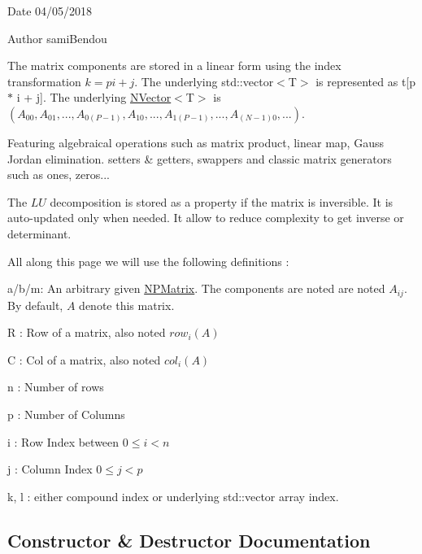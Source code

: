 \begin{DoxyDate}{Date}
04/05/2018 
\end{DoxyDate}
\begin{DoxyAuthor}{Author}
sami\+Bendou
\end{DoxyAuthor}
The matrix components are stored in a linear form using the index transformation $ k = p i + j $. The underlying {\ttfamily std\+::vector$<$T$>$} is represented as {\ttfamily t\mbox{[}p $\ast$ i + j\mbox{]}}. The underlying {\ttfamily \mbox{\hyperlink{class_n_vector}{N\+Vector}}$<$T$>$} is $ (A_{00}, A_{01}, ..., A_{0(P - 1)}, A_{10}, ..., A_{1(P - 1)}, ..., A_{(N-1)0}, ...) $.

Featuring algebraical operations such as matrix product, linear map, Gauss Jordan elimination. setters \& getters, swappers and classic matrix generators such as ones, zeros...

The $ LU $ decomposition is stored as a property if the matrix is inversible. It is auto-\/updated only when needed. It allow to reduce complexity to get inverse or determinant.

All along this page we will use the following definitions \+:
\begin{DoxyItemize}
\item {\ttfamily a}/{\ttfamily b}/{\ttfamily m}\+: An arbitrary given \mbox{\hyperlink{class_n_p_matrix}{N\+P\+Matrix}}. The components are noted are noted $ A_{ij} $. By default, $ A $ denote {\ttfamily this} matrix.
\item {\ttfamily R} \+: Row of a matrix, also noted $ row_{i}(A) $
\item {\ttfamily C} \+: Col of a matrix, also noted $ col_{i}(A) $
\item {\ttfamily n} \+: Number of rows
\item {\ttfamily p} \+: Number of Columns
\item {\ttfamily i} \+: Row Index between $ 0 \leq i < n $
\item {\ttfamily j} \+: Column Index $ 0 \leq j < p $
\item {\ttfamily k}, {\ttfamily l} \+: either compound index or underlying {\ttfamily std\+::vector} array index. 
\end{DoxyItemize}

\subsection{Constructor \& Destructor Documentation}
\mbox{\label{class_n_p_matrix_a911b2434435553b06276977f3a86bb87}} 
